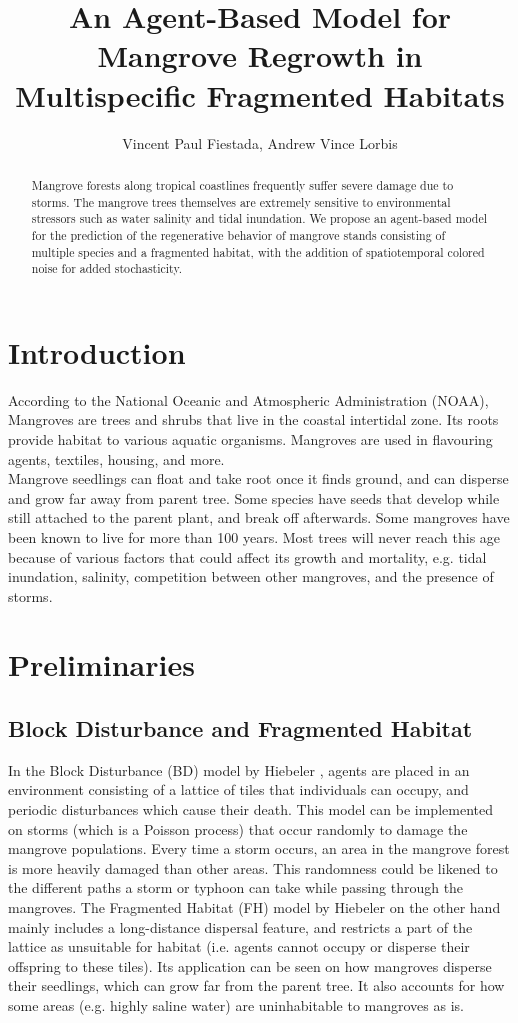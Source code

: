 \documentclass[12pt,letterpaper]{article}
\title{An Agent-Based Model for Mangrove Regrowth in Multispecific Fragmented Habitats}
\author{Vincent Paul Fiestada, Andrew Vince Lorbis}
\begin{document}
\prefacepages

\begin{abstract}
Mangrove forests along tropical coastlines frequently suffer severe damage due to storms. The mangrove trees themselves are extremely sensitive to environmental stressors such as water salinity and tidal inundation. We propose an agent-based model for the prediction of the regenerative behavior of mangrove stands consisting of multiple species and a fragmented habitat, with the addition of spatiotemporal colored noise for added stochasticity. 
\end{abstract}

\afterpreface

\section{Introduction}
According to the National Oceanic and Atmospheric Administration (NOAA), Mangroves are trees and shrubs that live in the coastal intertidal zone. Its roots provide habitat to various aquatic organisms. Mangroves are used in flavouring agents, textiles, housing, and more.\\ 
Mangrove seedlings can float and take root once it finds ground, and can disperse and grow far away from parent tree. Some species have seeds that develop while still attached to the parent plant, and break off afterwards.
Some mangroves have been known to live for more than 100 years. Most trees will never reach this age because of various factors that could affect its growth and mortality, e.g. tidal inundation, salinity, competition between other mangroves, and the presence of storms.
\section{Preliminaries}
\subsection{Block Disturbance and Fragmented Habitat}
In the Block Disturbance (BD) model by Hiebeler \cite{hiebelerdisturbance}, agents are placed in an environment consisting of a lattice of tiles that individuals can occupy, and periodic disturbances which cause their death. This model can be implemented on storms (which is a Poisson process) that occur randomly to damage the mangrove populations. Every time a storm occurs, an area in 
the mangrove forest is more heavily damaged than other areas. This randomness could be likened
to the different paths a storm or typhoon can take while passing through the mangroves.
\newline\newline
The Fragmented Habitat (FH) model by Hiebeler \cite{hiebelerfragmented} on the other hand
mainly includes a long-distance dispersal feature, and restricts a part of the lattice as unsuitable for habitat (i.e. agents cannot occupy or disperse their offspring to these tiles).
Its application can be seen on how mangroves disperse their seedlings, which can grow far from the parent tree. It also accounts for how some areas (e.g. highly saline water)
are uninhabitable to mangroves as is.
\end{document}
